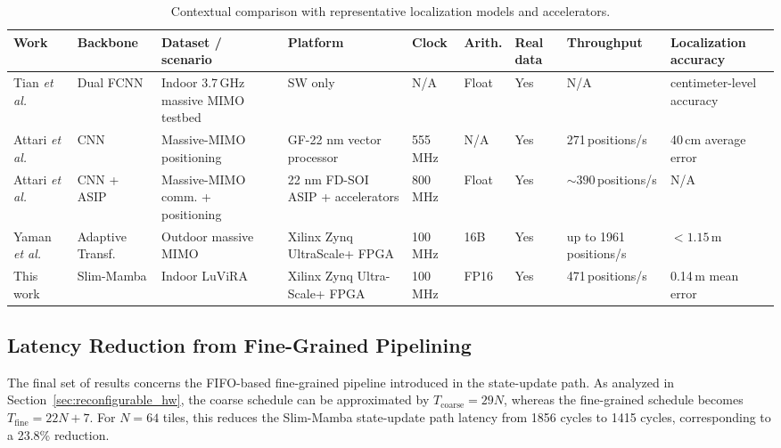 \documentclass[lettersize,journal]{IEEEtran}
\begin{document}
\begin{table}[!t]
\caption{Contextual comparison with representative localization models and accelerators.}
\label{tab:accelerator_compare_tcas}
\begin{center}
\scriptsize
\setlength{\tabcolsep}{2.5pt}
\renewcommand{\arraystretch}{1.10}
\begin{tabular}{|p{}|p{}|p{}|p{}|p{}|p{}|p{}|p{}|p{}|} 
\hline
\textbf{Work} & \textbf{Backbone} & \textbf{Dataset / scenario} & \textbf{Platform} & \textbf{Clock} & \textbf{Arith.} & \textbf{Real data} & \textbf{Throughput} & \textbf{Localization accuracy} \\
\hline
Tian \emph{et al.}~\cite{Tian2024} & Dual FCNN & Indoor 3.7\,GHz massive MIMO testbed & SW only & N/A & Float & Yes & N/A & centimeter-level accuracy \\
\hline
Attari \emph{et al.}~\cite{AttariISCAS2021} & CNN & Massive-MIMO positioning & GF-22 nm vector processor & 555\,MHz & N/A & Yes & 271\,positions/s & 40\,cm average error \\
\hline
Attari \emph{et al.}~\cite{AttariASIP2025} & CNN + ASIP & Massive-MIMO comm. + positioning & 22 nm FD-SOI ASIP + accelerators & 800\,MHz & Float & Yes & \(\sim 390\)\,positions/s & N/A \\
\hline
Yaman \emph{et al.}~\cite{YamanTransformer2026} & Adaptive Transf. & Outdoor massive MIMO & Xilinx Zynq UltraScale+ FPGA & 100\,MHz & 16B & Yes & up to 1961\,positions/s & \(< 1.15\)\,m \\
\hline
This work & Slim-Mamba & Indoor LuViRA & Xilinx Zynq Ultra-Scale+ FPGA & 100\,MHz & FP16 & Yes & 471\,positions/s & 0.14\,m mean error \\
\hline
\end{tabular}
\end{center}
\end{table}

\subsection{Latency Reduction from Fine-Grained Pipelining}

The final set of results concerns the FIFO-based fine-grained pipeline
introduced in the state-update path. As analyzed in
Section~\ref{sec:reconfigurable_hw}, the coarse schedule can be approximated by
\(T_{\mathrm{coarse}}=29N\), whereas the fine-grained schedule becomes
\(T_{\mathrm{fine}}=22N+7\). For \(N=64\) tiles, this reduces the Slim-Mamba state-update path
latency from 1856 cycles to 1415 cycles, corresponding to a 23.8\% reduction.
\end{document}

